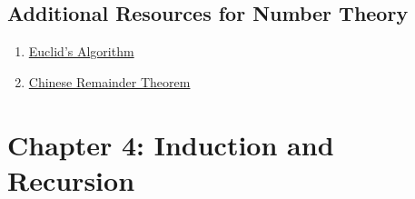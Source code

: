 \documentclass{article}
\begin{document}

\subsection*{Additional Resources for Number Theory}
\begin{enumerate}
    \item \href{https://www.youtube.com/watch?v=yHwneN6zJmU}{Euclid's Algorithm}
    \item \href{https://www.youtube.com/watch?v=ru7mWZJlRQg&t=276s}{Chinese Remainder Theorem} 
\end{enumerate}
\newpage

\section*{Chapter 4: Induction and Recursion}
\end{document}
